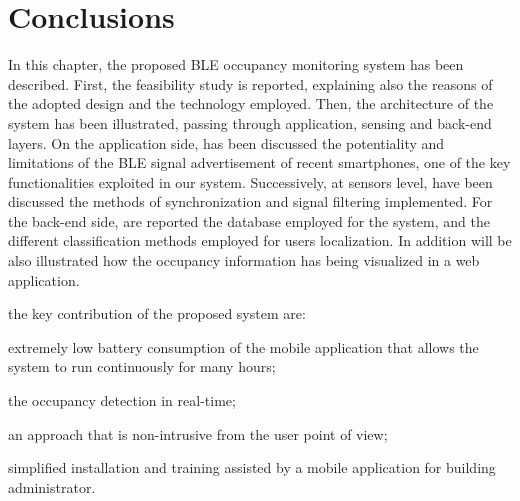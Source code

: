 \section{Conclusions}
\label{sec:conclusion}

In this chapter, the proposed BLE occupancy monitoring system has been described. First, the feasibility study is reported, explaining also the reasons of the adopted design and the technology employed. Then, the architecture of the system has been illustrated, passing through application, sensing and back-end layers. On the application side, has been discussed the potentiality and limitations of the BLE signal advertisement of recent smartphones, one of the key functionalities exploited in our system. Successively, at sensors level, have been discussed the methods of synchronization and signal filtering implemented. For the back-end side, are reported the database employed for the system, and the different classification methods employed for users localization. In addition will be also illustrated how the occupancy information has being visualized in a web application.

the key contribution of the proposed system are:
\begin{enumerate*}[label={\textbf{(\arabic*)}}]
\item extremely low battery consumption of the mobile application that allows the system to run continuously for many hours;
\item the occupancy detection in real-time;
\item an approach that is non-intrusive from the user point of view;
\item simplified installation and training assisted by a mobile application for building administrator.
\end{enumerate*}
%
